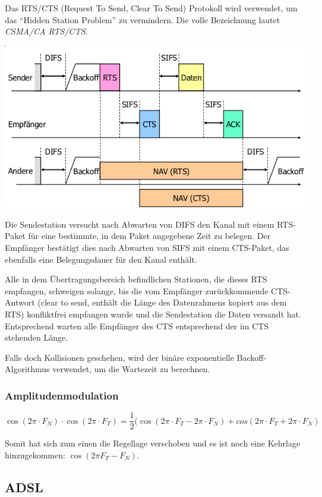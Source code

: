 Das RTS/CTS (Request To Send, Clear To Send) Protokoll wird verwendet, um das
``Hidden Station Problem'' zu vermindern. Die volle Bezeichnung lautet
\textit{CSMA/CA RTS/CTS}.

\begin{center}
	\includegraphics[width=.8\textwidth]{media/rts_cts.png}
\end{center}

Die Sendestation versucht nach Abwarten von DIFS den Kanal mit einem RTS-Paket
für eine bestimmte, in dem Paket angegebene Zeit zu belegen. Der Empfänger
bestätigt dies nach Abwarten von SIFS mit einem CTS-Paket, das ebenfalls eine
Belegungsdauer für den Kanal enthält.

Alle in dem Übertragungsbereich befindlichen Stationen, die dieses RTS
empfangen, schweigen solange, bis die vom Empfänger zurückkommende CTS-Antwort
(clear to send, enthält die Länge des Datenrahmens kopiert aus dem RTS)
konfliktfrei empfangen wurde und die Sendestation die Daten versandt hat.
Entsprechend warten alle Empfänger des CTS entsprechend der im CTS stehenden
Länge.

Falls doch Kollisionen geschehen, wird der binäre exponentielle
Backoff-Algorithmus verwendet, um die Wartezeit zu berechnen.


\subsubsection{Amplitudenmodulation}

\[
	\cos (2\pi \cdot F_N) \cdot \cos (2\pi \cdot F_T)
	= \frac{1}{2}(\cos (2\pi \cdot F_T - 2\pi \cdot F_N)
	+ cos(2\pi \cdot F_T + 2\pi \cdot F_N)
\]

Somit hat sich zum einen die Regellage verschoben und es ist noch eine Kehrlage
hinzugekommen: $\cos (2\pi F_T - F_N)$.


\subsection{ADSL}

